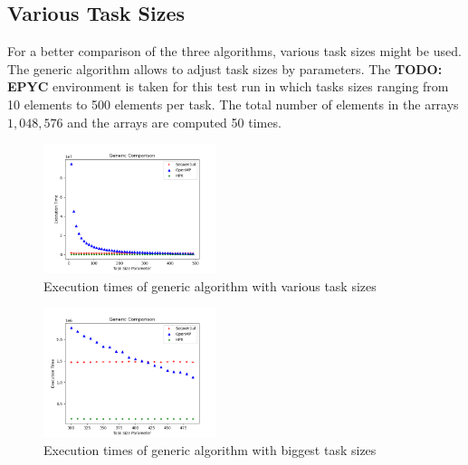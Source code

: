 \subsection{Various Task Sizes}
For a better comparison of the three algorithms, various task sizes might be used.
The generic algorithm allows to adjust task sizes by parameters.
The \textbf{TODO: EPYC} environment is taken for this test run in which tasks sizes ranging from 10 elements to 500 elements per task.
The total number of elements in the arrays \(1,048,576\) and the arrays are computed 50 times.
\begin{figure}[h]
	\centering
	\includegraphics[width=0.45\textwidth]{figures/genericComp.png}
	\caption{Execution times of generic algorithm with various task sizes}
	\label{fig:genComp}
\end{figure}

\begin{figure}[h]
	\centering
	\includegraphics[width=0.45\textwidth]{figures/genericCompLast.png}
	\caption{Execution times of generic algorithm with biggest task sizes}
	\label{fig:genComp_Last}
\end{figure}

